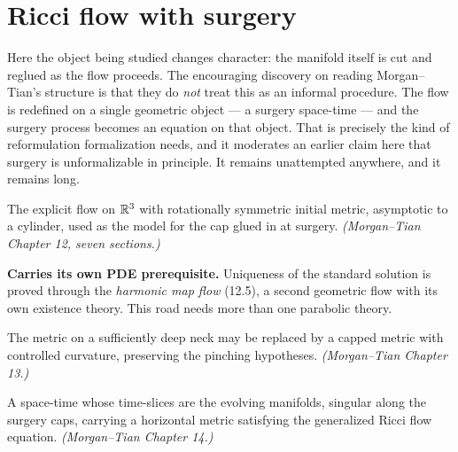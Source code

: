 \chapter{Ricci flow with surgery}
\label{chap:surgery}

Here the object being studied changes character: the manifold itself is cut and
reglued as the flow proceeds. The encouraging discovery on reading Morgan--Tian's
structure is that they do \emph{not} treat this as an informal procedure. The
flow is redefined on a single geometric object --- a surgery space-time --- and
the surgery process becomes an equation on that object. That is precisely the
kind of reformulation formalization needs, and it moderates an earlier claim
here that surgery is unformalizable in principle. It remains unattempted
anywhere, and it remains long.

\begin{definition}
  \label{def:standard-solution}
  The explicit flow on $\mathbb{R}^3$ with rotationally symmetric initial metric,
  asymptotic to a cylinder, used as the model for the cap glued in at surgery.
  \emph{(Morgan--Tian Chapter 12, seven sections.)}

  \textbf{Carries its own PDE prerequisite.} Uniqueness of the standard solution
  is proved through the \emph{harmonic map flow} (12.5), a second geometric flow
  with its own existence theory. This road needs more than one parabolic theory.
\end{definition}

\begin{theorem}
  \label{thm:neck-surgery}
  The metric on a sufficiently deep neck may be replaced by a capped metric with
  controlled curvature, preserving the pinching hypotheses.
  \emph{(Morgan--Tian Chapter 13.)}
\end{theorem}

\begin{definition}
  \label{def:surgery}
  A space-time whose time-slices are the evolving manifolds, singular along the
  surgery caps, carrying a horizontal metric satisfying the generalized Ricci
  flow equation. \emph{(Morgan--Tian Chapter 14.)}
\end{definition}

